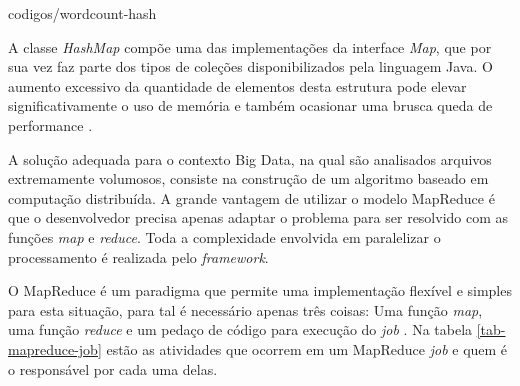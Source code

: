 \begin{center}

		{codigos/wordcount-hash}
\end{center}

A classe \textit{HashMap} compõe uma das implementações da interface \textit{Map}, que por sua vez faz parte dos tipos de coleções disponibilizados pela linguagem Java. O aumento excessivo da quantidade de elementos desta estrutura pode elevar significativamente o uso de memória e também ocasionar uma brusca queda de performance \cite{oaks2014}.

A solução adequada para o contexto Big Data, na qual são analisados arquivos extremamente volumosos, consiste na construção de um algoritmo baseado em computação distribuída. A grande vantagem de utilizar o modelo MapReduce é que o desenvolvedor precisa apenas adaptar o problema para ser resolvido com as funções \textit{map} e \textit{reduce}. Toda a complexidade envolvida em paralelizar o processamento é realizada pelo \textit{framework}.

O MapReduce é um paradigma que permite uma implementação flexível e simples para esta situação, para tal é necessário apenas três coisas: Uma função \textit{map}, uma função \textit{reduce} e um pedaço de código para execução do \textit{job} \cite{white2012}. Na tabela \ref{tab-mapreduce-job} estão as atividades que ocorrem em um MapReduce \textit{job} e quem é o responsável por cada uma delas.

